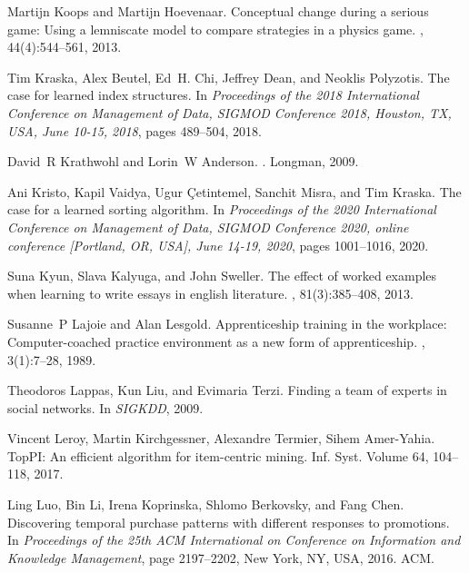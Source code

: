 \documentclass[11pt]{article}
\begin{document}
\begin{thebibliography}{10}
\begin{small}
Martijn Koops and Martijn Hoevenaar.
\newblock Conceptual change during a serious game: Using a lemniscate model to
  compare strategies in a physics game.
, 44(4):544--561, 2013.

Tim Kraska, Alex Beutel, Ed~H. Chi, Jeffrey Dean, and Neoklis Polyzotis.
\newblock The case for learned index structures.
\newblock In {\em Proceedings of the 2018 International Conference on
  Management of Data, {SIGMOD} Conference 2018, Houston, TX, USA, June 10-15,
  2018}, pages 489--504, 2018.

David~R Krathwohl and Lorin~W Anderson.
.
\newblock Longman, 2009.

Ani Kristo, Kapil Vaidya, Ugur {\c{C}}etintemel, Sanchit Misra, and Tim Kraska.
\newblock The case for a learned sorting algorithm.
\newblock In {\em Proceedings of the 2020 International Conference on
  Management of Data, {SIGMOD} Conference 2020, online conference [Portland,
  OR, USA], June 14-19, 2020}, pages 1001--1016, 2020.

Suna Kyun, Slava Kalyuga, and John Sweller.
\newblock The effect of worked examples when learning to write essays in
  english literature.
, 81(3):385--408, 2013.

Susanne~P Lajoie and Alan Lesgold.
\newblock Apprenticeship training in the workplace: Computer-coached practice
  environment as a new form of apprenticeship.
, 3(1):7--28, 1989.

Theodoros Lappas, Kun Liu, and Evimaria Terzi.
\newblock Finding a team of experts in social networks.
\newblock In {\em SIGKDD}, 2009.

Vincent Leroy, Martin Kirchgessner, Alexandre Termier, Sihem Amer-Yahia.
\newblock TopPI: An efficient algorithm for item-centric mining.
\newblock Inf. Syst. Volume 64, 104--118, 2017.

Ling Luo, Bin Li, Irena Koprinska, Shlomo Berkovsky, and Fang Chen.
\newblock Discovering temporal purchase patterns with different responses to
  promotions.
\newblock In {\em Proceedings of the 25th ACM International on Conference on
  Information and Knowledge Management}, page 2197–2202, New York, NY, USA,
  2016. ACM.


\end{small}
\end{thebibliography}
\end{document}
